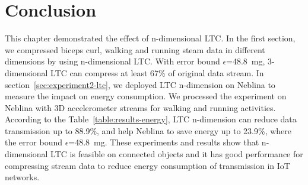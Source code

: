 \section{Conclusion}
This chapter demonstrated the effect of n-dimensional LTC. In the first section,
we compressed biceps curl, walking and running steam data in different
dimensions by using n-dimensional LTC. With error bound $\epsilon$=48.8\ mg,
3-dimensional LTC can compress at least 67\% of original data stream.
In section~\ref{sec:experiment2-ltc}, we deployed LTC n-dimension on Neblina to
measure the impact on energy consumption. We processed the experiment on Neblina
with 3D accelerometer streams for walking and running activities. According to
the Table~\ref{table:results-energy}, LTC n-dimension can reduce data
transmission up to 88.9\%, and help Neblina to save energy up to 23.9\%, where
the error bound $\epsilon$=48.8\ mg. 
These experiments and results show that n-dimensional LTC is feasible on
connected objects and it has good performance for compressing stream data to
reduce energy consumption of transmission in IoT networks. 
